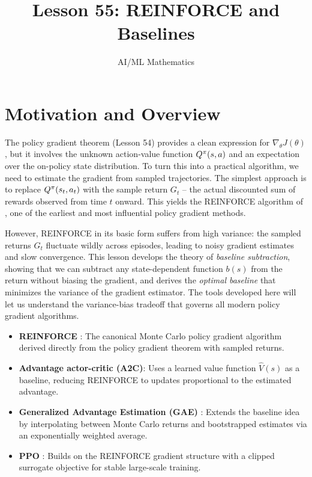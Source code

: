 \documentclass[11pt,a4paper]{article}
\title{Lesson 55: REINFORCE and Baselines}
\author{AI/ML Mathematics}
\date{}
\begin{document}
\maketitle
\tableofcontents
\newpage

\section{Motivation and Overview}

The policy gradient theorem (Lesson 54) provides a clean expression for
$\nabla_\theta J(\theta)$, but it involves the unknown action-value
function $Q^{\pi}(s,a)$ and an expectation over the on-policy state
distribution. To turn this into a practical algorithm, we need to
estimate the gradient from sampled trajectories. The simplest approach is
to replace $Q^{\pi}(s_t, a_t)$ with the sample return $G_t$ -- the actual
discounted sum of rewards observed from time $t$ onward. This yields the
REINFORCE algorithm of \citet{williams1992}, one of the earliest and most
influential policy gradient methods.

However, REINFORCE in its basic form suffers from high variance: the
sampled returns $G_t$ fluctuate wildly across episodes, leading to noisy
gradient estimates and slow convergence. This lesson develops the theory
of \emph{baseline subtraction}, showing that we can subtract any
state-dependent function $b(s)$ from the return without biasing the
gradient, and derives the \emph{optimal baseline} that minimizes the
variance of the gradient estimator. The tools developed here will let us
understand the variance-bias tradeoff that governs all modern policy
gradient algorithms.

\begin{rlconnection}
\begin{itemize}
  \item \textbf{REINFORCE} \citep{williams1992}: The canonical Monte Carlo
    policy gradient algorithm derived directly from the policy gradient
    theorem with sampled returns.
  \item \textbf{Advantage actor-critic (A2C)}: Uses a learned value
    function $\hat{V}(s)$ as a baseline, reducing REINFORCE to updates
    proportional to the estimated advantage.
  \item \textbf{Generalized Advantage Estimation (GAE)}
    \citep{schulman2015}: Extends the baseline idea by interpolating
    between Monte Carlo returns and bootstrapped estimates via an
    exponentially weighted average.
  \item \textbf{PPO} \citep{schulman2017}: Builds on the REINFORCE
    gradient structure with a clipped surrogate objective for stable
    large-scale training.
\end{itemize}
\end{rlconnection}
\end{document}
